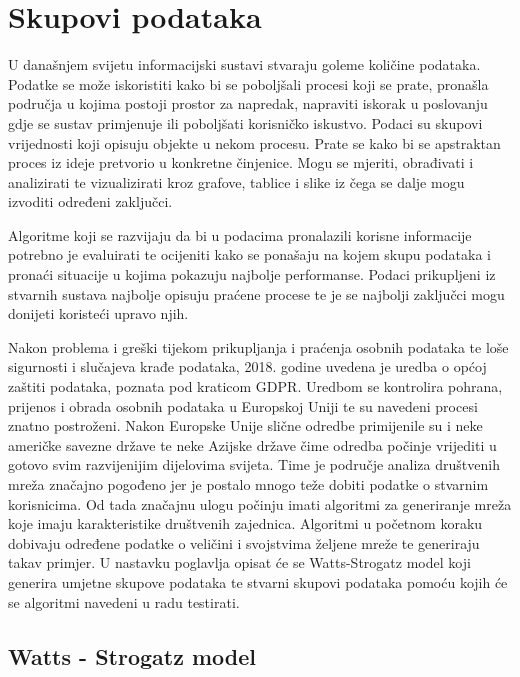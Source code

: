 \chapter{Skupovi podataka}

U današnjem svijetu informacijski sustavi stvaraju goleme količine podataka. Podatke se može iskoristiti kako bi se poboljšali procesi koji se prate, pronašla područja u kojima postoji prostor za napredak, napraviti iskorak u poslovanju gdje se sustav primjenuje ili poboljšati korisničko iskustvo. Podaci su skupovi vrijednosti koji opisuju objekte u nekom procesu. Prate se kako bi se apstraktan proces iz ideje pretvorio u konkretne činjenice. Mogu se mjeriti, obrađivati i analizirati te vizualizirati kroz grafove, tablice i slike iz čega se dalje mogu izvoditi određeni zaključci. 


Algoritme koji se razvijaju da bi u podacima pronalazili korisne informacije potrebno je evaluirati te ocijeniti kako se ponašaju na kojem skupu podataka i pronaći situacije u kojima pokazuju najbolje performanse. Podaci prikupljeni iz stvarnih sustava najbolje opisuju praćene procese te je se najbolji zaključci mogu donijeti koristeći upravo njih.

Nakon problema i greški tijekom prikupljanja i praćenja osobnih podataka te loše sigurnosti i slučajeva krađe podataka, 2018. godine uvedena je uredba o općoj zaštiti podataka, poznata pod kraticom GDPR. Uredbom se kontrolira pohrana, prijenos i obrada osobnih podataka u Europskoj Uniji te su navedeni procesi znatno postroženi. Nakon Europske Unije slične odredbe primijenile su i neke američke savezne države te neke Azijske države čime odredba počinje vrijediti u gotovo svim razvijenijim dijelovima svijeta. Time je područje analiza društvenih mreža značajno pogođeno jer je postalo mnogo teže dobiti podatke o stvarnim korisnicima. Od tada značajnu ulogu počinju imati algoritmi za generiranje mreža koje imaju karakteristike društvenih zajednica. Algoritmi u početnom koraku dobivaju određene podatke o veličini i svojstvima željene mreže te generiraju takav primjer. U nastavku poglavlja opisat će se Watts-Strogatz model koji generira umjetne skupove podataka te stvarni skupovi podataka pomoću kojih će se algoritmi navedeni u radu testirati.



\section{Watts - Strogatz model}

